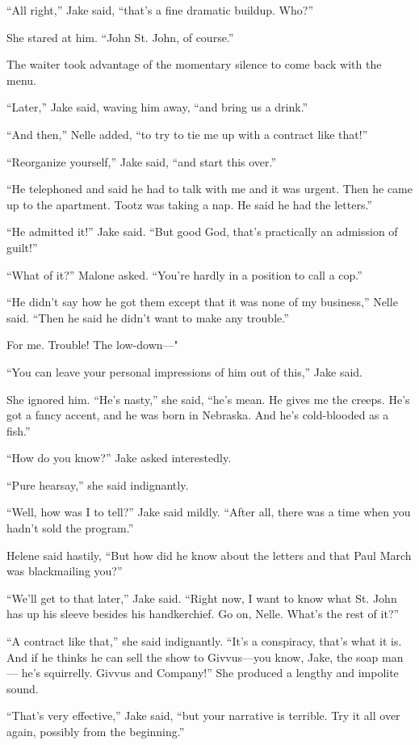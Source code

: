 \documentclass{novel}
\begin{document}
“All right,” Jake said, “that’s a fine dramatic buildup. Who?”

She stared at him. “John St. John, of course.”

The waiter took advantage of the momentary silence to come back with the menu.

“Later,” Jake said, waving him away, “and bring us a drink.”

“And then,” Nelle added, “to try to tie me up with a contract like that!”

“Reorganize yourself,” Jake said, “and start this over.”

“He telephoned and said he had to talk with me and it was urgent. Then he came up to the apartment. Tootz was taking a nap. He said he had the letters.”

“He admitted it!” Jake said. “But good God, that’s practically an admission of guilt!”

“What of it?” Malone asked. “You’re hardly in a position to call a cop.”

“He didn’t say how he got them except that it was none of my business,” Nelle said. “Then he said he didn’t want to make any trouble.”

For me. Trouble! The low-down—"

“You can leave your personal impressions of him out of this,” Jake said.

She ignored him. “He’s nasty,” she said, “he’s mean. He gives me the creeps. He’s got a fancy accent, and he was born in Nebraska. And he’s cold-blooded as a fish.”

“How do you know?” Jake asked interestedly.

“Pure hearsay,” she said indignantly.

“Well, how was I to tell?” Jake said mildly. “After all, there was a time when you hadn’t sold the program.”

Helene said hastily, “But how did he know about the letters and that Paul March was blackmailing you?”

“We’ll get to that later,” Jake said. “Right now, I want to know what St. John has up his sleeve besides his handkerchief. Go on, Nelle. What’s the rest of it?”

“A contract like that,” she said indignantly. “It’s a conspiracy, that’s what it is. And if he thinks he can sell the show to Givvus—you know, Jake, the soap man— he’s squirrelly. Givvus and Company!” She produced a lengthy and impolite sound.

“That’s very effective,” Jake said, “but your narrative is terrible. Try it all over again, possibly from the beginning.”
\end{document}
